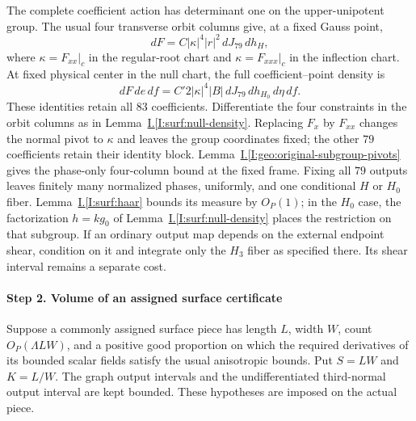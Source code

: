 \documentclass[11pt]{amsart}
\theoremstyle{definition}
\theoremstyle{remark}
\numberwithin{equation}{section}
\newcommand{\partIref}[1]{\hyperref[I:#1]{I.\ref*{I:#1}}}
\begin{document}
The complete coefficient action has determinant one on the upper-unipotent group. The usual four transverse orbit columns give, at a fixed Gauss point,
\begin{equation}\label{low:6:nc36:gauss-density}
dF=C|\kappa|^4|r|^2\,dJ_{79}\,dh_H,
\end{equation}
where $\kappa=F_{xx}|_c$ in the regular-root chart and $\kappa=F_{xxx}|_c$ in the inflection chart. At fixed physical center in the null chart, the full coefficient--point density is
\begin{equation}\label{low:6:nc36:null-density}
dF\,de\,df=C'2|\kappa|^4|B|\,dJ_{79}\,dh_{H_0}\,d\eta\,df.
\end{equation}
These identities retain all $83$ coefficients. Differentiate the four constraints in the orbit columns as in Lemma~\partIref{surf:null-density}. Replacing $F_x$ by $F_{xx}$ changes the normal pivot to $\kappa$ and leaves the group coordinates fixed; the other $79$ coefficients retain their identity block. Lemma~\partIref{geo:original-subgroup-pivots} gives the phase-only four-column bound at the fixed frame. Fixing all $79$ outputs leaves finitely many normalized phases, uniformly, and one conditional $H$ or $H_0$ fiber. Lemma~\partIref{surf:haar} bounds its measure by $O_P(1)$; in the $H_0$ case, the factorization $h=k g_0$ of Lemma~\partIref{surf:null-density} places the restriction on that subgroup. If an ordinary output map depends on the external endpoint shear, condition on it and integrate only the $H_3$ fiber as specified there. Its shear interval remains a separate cost.

\paragraph{Step 2. Volume of an assigned surface certificate}\label{low:6:nc36:certificate-section}
Suppose a commonly assigned surface piece has length $L$, width $W$, count $O_P(\Lambda LW)$, and a positive good proportion on which the required derivatives of its bounded scalar fields satisfy the usual anisotropic bounds. Put $S=LW$ and $K=L/W$. The graph output intervals and the undifferentiated third-normal output interval are kept bounded. These hypotheses are imposed on the actual piece.
\end{document}
